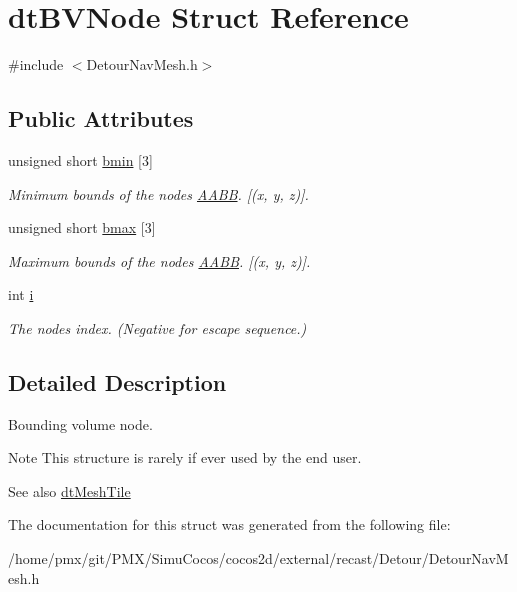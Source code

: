 \hypertarget{structdtBVNode}{}\section{dt\+B\+V\+Node Struct Reference}
\label{structdtBVNode}


{\ttfamily \#include $<$Detour\+Nav\+Mesh.\+h$>$}

\subsection*{Public Attributes}
\begin{DoxyCompactItemize}
\item 
\mbox{\label{structdtBVNode_a2a19864d4c7d09982972331967f862fd}} 
unsigned short \hyperlink{structdtBVNode_a2a19864d4c7d09982972331967f862fd}{bmin} \mbox{[}3\mbox{]}
\begin{DoxyCompactList}\small\item\em Minimum bounds of the node\textquotesingle{}s \hyperlink{classAABB}{A\+A\+BB}. \mbox{[}(x, y, z)\mbox{]}. \end{DoxyCompactList}\item 
\mbox{\label{structdtBVNode_aff130cb9800bfd5dc0230f65a7bd7531}} 
unsigned short \hyperlink{structdtBVNode_aff130cb9800bfd5dc0230f65a7bd7531}{bmax} \mbox{[}3\mbox{]}
\begin{DoxyCompactList}\small\item\em Maximum bounds of the node\textquotesingle{}s \hyperlink{classAABB}{A\+A\+BB}. \mbox{[}(x, y, z)\mbox{]}. \end{DoxyCompactList}\item 
\mbox{\label{structdtBVNode_aa7de4b9e1151b9f4bf02154cfb24a45a}} 
int \hyperlink{structdtBVNode_aa7de4b9e1151b9f4bf02154cfb24a45a}{i}
\begin{DoxyCompactList}\small\item\em The node\textquotesingle{}s index. (Negative for escape sequence.) \end{DoxyCompactList}\end{DoxyCompactItemize}


\subsection{Detailed Description}
Bounding volume node. \begin{DoxyNote}{Note}
This structure is rarely if ever used by the end user. 
\end{DoxyNote}
\begin{DoxySeeAlso}{See also}
\hyperlink{structdtMeshTile}{dt\+Mesh\+Tile} 
\end{DoxySeeAlso}


The documentation for this struct was generated from the following file\+:\begin{DoxyCompactItemize}
\item 
/home/pmx/git/\+P\+M\+X/\+Simu\+Cocos/cocos2d/external/recast/\+Detour/Detour\+Nav\+Mesh.\+h\end{DoxyCompactItemize}
